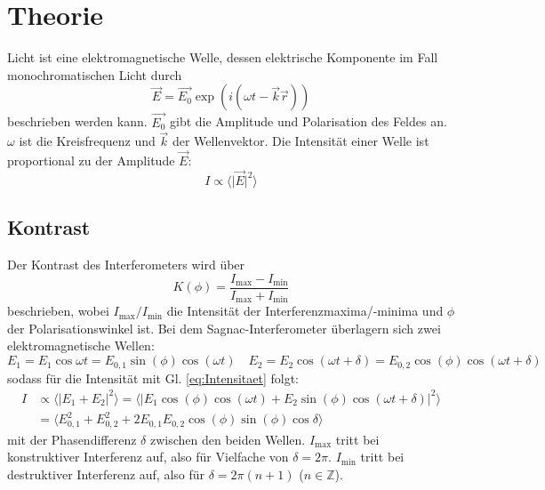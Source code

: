 \section{Theorie}
\label{sec:Theorie}

Licht ist eine elektromagnetische Welle, 
dessen elektrische Komponente im Fall monochromatischen Licht durch
\begin{equation}
  \label{eq:Welle}
  \vec{E}=\vec{E_0}\exp{\left(i (\omega t-\vec{k}\vec{r})\right)}
\end{equation}
beschrieben werden kann. 
$\vec{E_0}$ gibt die Amplitude und Polarisation des Feldes
an.
$\omega$ ist die Kreisfrequenz und  $\vec{k}$ der Wellenvektor.
Die Intensität einer Welle ist proportional zu der Amplitude $\vec{E}$:
\begin{equation}
  \label{eq:Intensitaet}
  I \propto \langle \lvert \vec{E} \rvert^2 \rangle
\end{equation} 


\subsection{Kontrast}%
Der Kontrast des Interferometers wird über 
\begin{equation}
  K(\phi)= \frac{I_{\text{max}}-I_{\text{min}}}{I_{\text{max}}+I_{\text{min}}}
  \label{eq:Kontrast}
\end{equation}
beschrieben, 
wobei $I_{\text{max}} / I_{\text{min}}$ die Intensität der Interferenzmaxima/-minima 
und $\phi$ der Polarisationswinkel ist. 
\newline \newline
\noindent Bei dem Sagnac-Interferometer überlagern sich zwei elektromagnetische Wellen:
\begin{equation}
  E_1 = E_{1} \cos{\omega t} = E_{0,1} \sin(\phi) \cos{(\omega t)} \quad 
  E_2 = E_{2} \cos{(\omega t + \delta) } =E_{0,2} \cos(\phi)  \cos{(\omega t + \delta) } 
\end{equation}
\noindent sodass für die Intensität mit Gl. \eqref{eq:Intensitaet} folgt:
\begin{align}
  I &\propto \langle \lvert
  E_1+E_2 \rvert^2 \rangle =
  \langle \lvert E_1 \cos{(\phi)}\cos{(\omega t)} + E_2 \sin{(\phi)}\cos{(\omega t + \delta)} \rvert^2 \rangle \\
  &=  \langle E_{0,1}^2 + E_{0,2}^2 + 2E_{0,1}E_{0,2}\cos(\phi)\sin(\phi)\cos{\delta}  \rangle
\end{align}
mit der Phasendifferenz $\delta$ zwischen den beiden Wellen.
$I_{\text{max}}$ tritt bei konstruktiver Interferenz auf,
also für Vielfache von $\delta = 2\pi$.
$I_{\text{min}}$ tritt bei destruktiver Interferenz auf,
also für $\delta = 2\pi(n+1)$ ($n \in \mathbb{Z} $).

